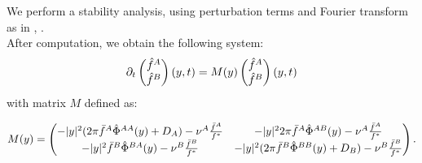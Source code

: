 We perform a stability analysis, using perturbation terms and Fourier transform as in \cite{twoparticule}, . \\
After computation, we obtain the following system:
\begin{align}
{\partial}_t \begin{pmatrix} {\hat{f}^{A}} \\ {\hat{f}^{B}}
\end{pmatrix}(y,t)=M(y)\begin{pmatrix} {\hat{f}^{A}} \\ {\hat{f}^{B}}
\end{pmatrix}(y,t)
\end{align}
with matrix $M$ defined as:

\begin{align}
M(y)=
 \begin{pmatrix} -|y|^2(2\pi{\bar{f}^A}{\hat{\Phi}^{AA}}(y)+D_A)-{\nu^A}\frac{{\bar{f}^A}}{{f^{*}}} & -|y|^22\pi{\bar{f}^A}{\hat{\Phi}^{AB}}(y)-{\nu^A}\frac{{\bar{f}^A}}{{f^{*}}} \\ 
-|y|^2{\bar{f}^B}{\hat{\Phi}^{BA}}(y)-{\nu^B}\frac{{\bar{f}^B}}{{f^{*}}} & -|y|^2(2\pi{\bar{f}^B}{\hat{\Phi}^{BB}}(y)+D_B)-{\nu^B}\frac{{\bar{f}^B}}{{f^{*}}} 
\end{pmatrix}.
\end{align}



